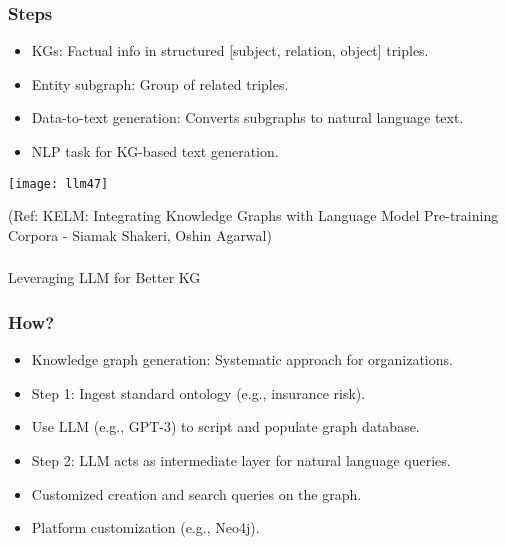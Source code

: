 \begin{frame}[fragile]\frametitle{Steps}

\begin{itemize}
\item  KGs: Factual info in structured [subject, relation, object] triples.
\item  Entity subgraph: Group of related triples.
\item  Data-to-text generation: Converts subgraphs to natural language text.
\item  NLP task for KG-based text generation.
\end{itemize}

\begin{center}
\texttt{[image: llm47]}
\end{center}	

{\tiny (Ref: KELM: Integrating Knowledge Graphs with Language Model Pre-training Corpora - Siamak Shakeri, Oshin Agarwal)}
\end{frame}




\begin{frame}[fragile]\frametitle{}
\begin{center}
{\Large Leveraging LLM for Better KG}

\end{center}
\end{frame}

\begin{frame}[fragile]\frametitle{How?}

\begin{itemize}
\item Knowledge graph generation: Systematic approach for organizations.
\item Step 1: Ingest standard ontology (e.g., insurance risk).
\item Use LLM (e.g., GPT-3) to script and populate graph database.
\item Step 2: LLM acts as intermediate layer for natural language queries.
\item Customized creation and search queries on the graph.
\item Platform customization (e.g., Neo4j).
\end{itemize}
\end{frame}

